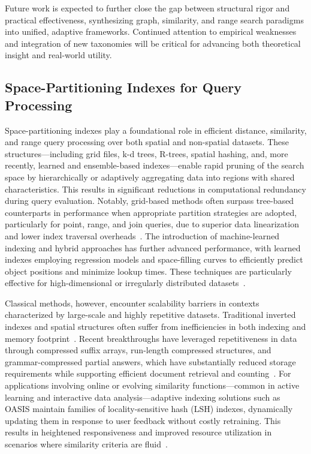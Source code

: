 \documentclass[sigconf]{acmart}
\begin{document}
Future work is expected to further close the gap between structural rigor and practical effectiveness, synthesizing graph, similarity, and range search paradigms into unified, adaptive frameworks. Continued attention to empirical weaknesses and integration of new taxonomies will be critical for advancing both theoretical insight and real-world utility.

\subsection{Space-Partitioning Indexes for Query Processing}

Space-partitioning indexes play a foundational role in efficient distance, similarity, and range query processing over both spatial and non-spatial datasets. These structures—including grid files, k-d trees, R-trees, spatial hashing, and, more recently, learned and ensemble-based indexes—enable rapid pruning of the search space by hierarchically or adaptively aggregating data into regions with shared characteristics. This results in significant reductions in computational redundancy during query evaluation. Notably, grid-based methods often surpass tree-based counterparts in performance when appropriate partition strategies are adopted, particularly for point, range, and join queries, due to superior data linearization and lower index traversal overheads~\cite{ref31,ref35}. The introduction of machine-learned indexing and hybrid approaches has further advanced performance, with learned indexes employing regression models and space-filling curves to efficiently predict object positions and minimize lookup times. These techniques are particularly effective for high-dimensional or irregularly distributed datasets~\cite{ref35,ref51,ref54,ref111}.

Classical methods, however, encounter scalability barriers in contexts characterized by large-scale and highly repetitive datasets. Traditional inverted indexes and spatial structures often suffer from inefficiencies in both indexing and memory footprint~\cite{ref75,ref98}. Recent breakthroughs have leveraged repetitiveness in data through compressed suffix arrays, run-length compressed structures, and grammar-compressed partial answers, which have substantially reduced storage requirements while supporting efficient document retrieval and counting~\cite{ref73,ref91}. For applications involving online or evolving similarity functions—common in active learning and interactive data analysis—adaptive indexing solutions such as OASIS maintain families of locality-sensitive hash (LSH) indexes, dynamically updating them in response to user feedback without costly retraining. This results in heightened responsiveness and improved resource utilization in scenarios where similarity criteria are fluid~\cite{ref56,ref111}.
\end{document}

